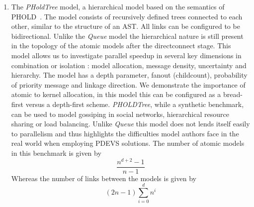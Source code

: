 \begin{enumerate}
	\item The \textit{PHoldTree} model, a hierarchical model based on the semantics of PHOLD~\cite{PHOLD}. The model consists of recursively defined trees connected to each other, similar to the structure of an AST. All links can be configured to be bidirectional. 
	Unlike the \textit{Queue} model the hierarchical nature is still present in the topology of the atomic models after the directconnect stage. This model allows us to investigate parallel speedup in several key dimensions in combination or isolation : model allocation, message density, uncertainty and hierarchy. The model has a depth parameter, fanout (childcount), probability of priority message and linkage direction. We demonstrate the importance of atomic to kernel allocation, in this model this can be configured as a bread-first versus a depth-first scheme.
	\textit{PHOLDTree}, while a synthetic benchmark, can be used to model gossiping in social networks, hierarchical resource sharing or load balancing. Unlike \textit{Queue} this model does not lends itself easily to parallelism and thus highlights the difficulties model authors face in the real world when employing PDEVS solutions.
	The number of atomic models in this benchmark is given by 
	\begin{equation} \label{eq:pholdtreemodelcount}
	\frac{n^{d+2}-1}{n-1}
	\end{equation}
	Whereas the number of links between the models is given by
	\begin{equation} \label{eq:pholdtreelinkcount}
	(2n-1)\sum_{i=0}^{d}{n^i}
	\end{equation}
\end{enumerate}

\newcommand{\modelfraction}{0.65}
\newcommand{\betweenmodels}{0.8cm}


